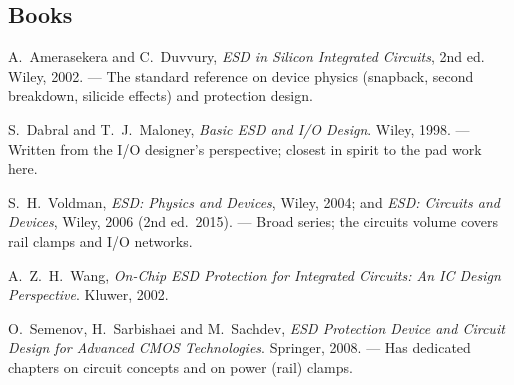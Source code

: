 \documentclass[11pt,a4paper]{article}
\begin{document}
\subsection*{Books}
\begin{enumerate}[label={[B\arabic*]}, leftmargin=*]
  \item A.~Amerasekera and C.~Duvvury, \emph{ESD in Silicon Integrated
        Circuits}, 2nd ed. Wiley, 2002. --- The standard reference on device
        physics (snapback, second breakdown, silicide effects) and protection
        design.
  \item S.~Dabral and T.~J.~Maloney, \emph{Basic ESD and I/O Design}. Wiley,
        1998. --- Written from the I/O designer's perspective; closest in
        spirit to the pad work here.
  \item S.~H.~Voldman, \emph{ESD: Physics and Devices}, Wiley, 2004; and
        \emph{ESD: Circuits and Devices}, Wiley, 2006 (2nd ed.\ 2015). ---
        Broad series; the circuits volume covers rail clamps and I/O networks.
  \item A.~Z.~H.~Wang, \emph{On-Chip ESD Protection for Integrated Circuits:
        An IC Design Perspective}. Kluwer, 2002.
  \item O.~Semenov, H.~Sarbishaei and M.~Sachdev, \emph{ESD Protection Device
        and Circuit Design for Advanced CMOS Technologies}. Springer, 2008. ---
        Has dedicated chapters on circuit concepts and on power (rail) clamps.
\end{enumerate}
\end{document}
